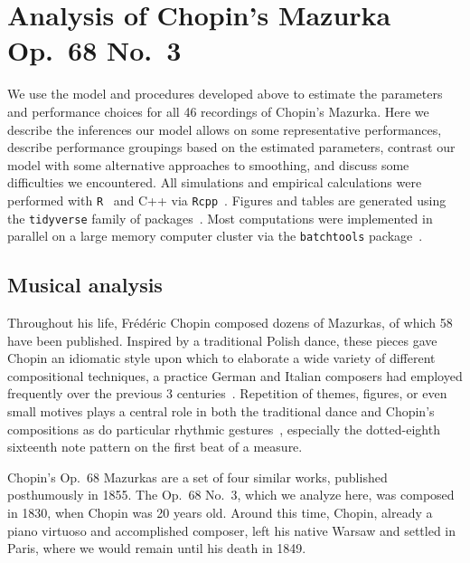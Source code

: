 \documentclass[aoas]{imsart}
\begin{document}
\section{Analysis of Chopin's Mazurka Op.\ 68 No.\ 3}
\label{sec:analys-chop-mazurka}

We use the model and procedures developed above to estimate the
parameters and performance choices for all 46 recordings of Chopin's
Mazurka. Here we describe the inferences our model allows on some
representative performances, describe performance groupings based on
the estimated parameters, contrast our model with some alternative
approaches to smoothing, and discuss some difficulties we encountered. All simulations and empirical calculations were performed with
\texttt{R}~\citep{R-Core-Team2019} and C++ via \texttt{Rcpp}~\citep{Eddelbuettel2013}. Figures and tables are generated
using the \texttt{tidyverse} family of
packages~\citep{Wickham2017, Wickham2016}.
Most
computations were implemented in parallel on a
large
memory computer cluster via
the \texttt{batchtools} package~\citep{LangBischl2017}. 

\subsection{Musical analysis}
\label{sec:musical-analysis}

Throughout his life, Fr\'ed\'eric Chopin composed dozens of Mazurkas,
of which 58 have been published. Inspired by a traditional Polish
dance, these pieces gave Chopin an idiomatic style upon which to
elaborate a wide variety of different compositional techniques, a
practice German and Italian composers had employed frequently over the previous 3
centuries~\citep{BurkholderGrout2014}. Repetition of themes, figures, or even small motives plays
a central role in both the traditional dance and Chopin's compositions
as do particular rhythmic gestures~\citep{Kallberg1996}, especially the
dotted-eighth sixteenth note pattern on the first beat of a measure. 

Chopin's Op.\ 68 Mazurkas are a set of four similar works, published
posthumously in 1855. The Op.\ 68 No.\ 3, which we analyze here, was
composed in 1830, when Chopin was 20 years old. Around this time,
Chopin, already a piano virtuoso and accomplished composer, left his
native Warsaw and settled in Paris, where we would remain until his
death in 1849.
\end{document}
